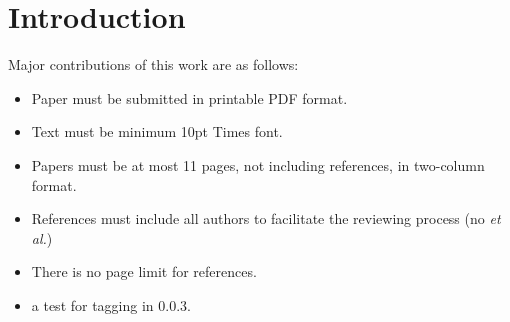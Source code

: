 \section{Introduction}

\vspace{1ex}Major contributions of this work are as follows:

\begin{itemize}
\item Paper must be submitted in printable PDF format.
\item Text must be minimum 10pt Times font.
\item Papers must be at most 11 pages, not including references, in two-column format.
\item References must include all authors to facilitate the reviewing process (no \emph{et al.})
\item There is no page limit for references.
\item a test for tagging in 0.0.3.
\end{itemize}


